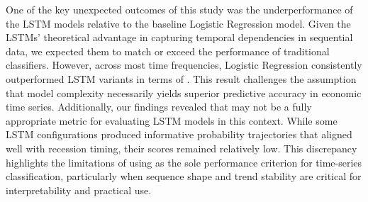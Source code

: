 One of the key unexpected outcomes of this study was the underperformance of the LSTM models relative to the baseline Logistic Regression model. Given the LSTMs’ theoretical advantage in capturing temporal dependencies in sequential data, we expected them to match or exceed the performance of traditional classifiers. However, across most time frequencies, Logistic Regression consistently outperformed LSTM variants in terms of \AUCone. This result challenges the assumption that model complexity necessarily yields superior predictive accuracy in economic time series. Additionally, our findings revealed that \AUCone may not be a fully appropriate metric for evaluating LSTM models in this context. While some LSTM configurations produced informative probability trajectories that aligned well with recession timing, their \AUCtwo scores remained relatively low. This discrepancy highlights the limitations of using \AUCone as the sole performance criterion for time-series classification, particularly when sequence shape and trend stability are critical for interpretability and practical use.



